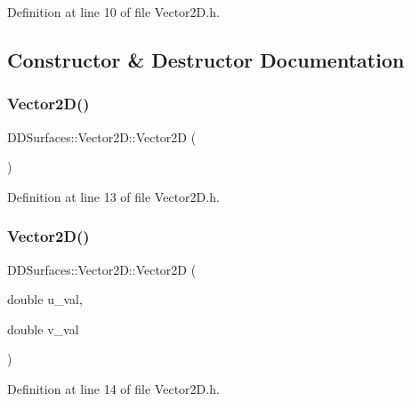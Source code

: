 Definition at line 10 of file Vector2\+D.\+h.



\subsection{Constructor \& Destructor Documentation}
\hypertarget{class_d_d_surfaces_1_1_vector2_d_a779bdb4c9b38f3b1c04d8cc56ef78efd}{}\label{class_d_d_surfaces_1_1_vector2_d_a779bdb4c9b38f3b1c04d8cc56ef78efd} 
\subsubsection{\texorpdfstring{Vector2\+D()}{Vector2D()}\hspace{0.1cm}{\footnotesize\ttfamily [1/2]}}
{\footnotesize\ttfamily D\+D\+Surfaces\+::\+Vector2\+D\+::\+Vector2D (\begin{DoxyParamCaption}{ }\end{DoxyParamCaption})\hspace{0.3cm}{\ttfamily [inline]}}



Definition at line 13 of file Vector2\+D.\+h.

\hypertarget{class_d_d_surfaces_1_1_vector2_d_ab41635e717c46f012b11db18f72d145c}{}\label{class_d_d_surfaces_1_1_vector2_d_ab41635e717c46f012b11db18f72d145c} 
\subsubsection{\texorpdfstring{Vector2\+D()}{Vector2D()}\hspace{0.1cm}{\footnotesize\ttfamily [2/2]}}
{\footnotesize\ttfamily D\+D\+Surfaces\+::\+Vector2\+D\+::\+Vector2D (\begin{DoxyParamCaption}\item[{double}]{u\+\_\+val,  }\item[{double}]{v\+\_\+val }\end{DoxyParamCaption})\hspace{0.3cm}{\ttfamily [inline]}}



Definition at line 14 of file Vector2\+D.\+h.




